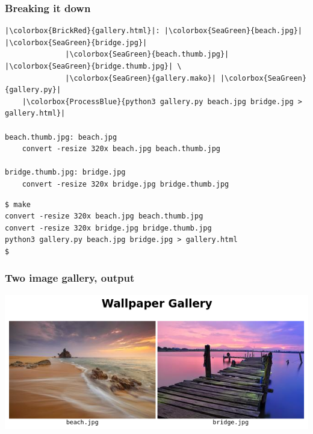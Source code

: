 \documentclass[xcolor=dvipsnames,t,compress]{beamer}
\begin{document}
\begin{frame}[fragile]
\frametitle{Breaking it down}
\vspace{-1em}
\begin{verbatim}
|\colorbox{BrickRed}{gallery.html}|: |\colorbox{SeaGreen}{beach.jpg}| |\colorbox{SeaGreen}{bridge.jpg}|
              |\colorbox{SeaGreen}{beach.thumb.jpg}| |\colorbox{SeaGreen}{bridge.thumb.jpg}| \
			  |\colorbox{SeaGreen}{gallery.mako}| |\colorbox{SeaGreen}{gallery.py}|
	|\colorbox{ProcessBlue}{python3 gallery.py beach.jpg bridge.jpg > gallery.html}|

beach.thumb.jpg: beach.jpg
	convert -resize 320x beach.jpg beach.thumb.jpg

bridge.thumb.jpg: bridge.jpg
	convert -resize 320x bridge.jpg bridge.thumb.jpg
\end{verbatim}
\begin{verbatim}
$ make
convert -resize 320x beach.jpg beach.thumb.jpg
convert -resize 320x bridge.jpg bridge.thumb.jpg
python3 gallery.py beach.jpg bridge.jpg > gallery.html
$
\end{verbatim}
\end{frame}

\begin{frame}[fragile]
\frametitle{Two image gallery, output}
\begin{center}
\includegraphics[scale=0.4]{images/gallery-2.png}
\end{center}
\end{frame}
\end{document}
